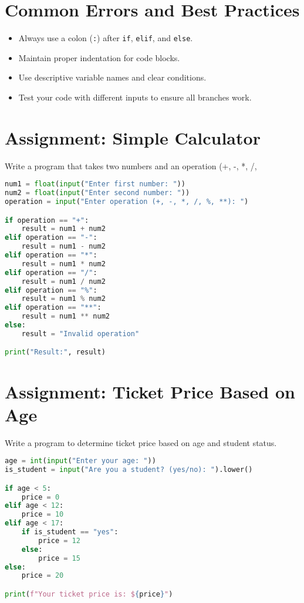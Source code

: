 \section{Common Errors and Best Practices}

\begin{itemize}
    \item Always use a colon (\texttt{:}) after \texttt{if}, \texttt{elif}, and \texttt{else}.
    \item Maintain proper indentation for code blocks.
    \item Use descriptive variable names and clear conditions.
    \item Test your code with different inputs to ensure all branches work.
\end{itemize}

\section{Assignment: Simple Calculator}

Write a program that takes two numbers and an operation (+, -, *, /, %

\begin{lstlisting}[language=Python]
num1 = float(input("Enter first number: "))
num2 = float(input("Enter second number: "))
operation = input("Enter operation (+, -, *, /, %, **): ")

if operation == "+":
    result = num1 + num2
elif operation == "-":
    result = num1 - num2
elif operation == "*":
    result = num1 * num2
elif operation == "/":
    result = num1 / num2
elif operation == "%":
    result = num1 % num2
elif operation == "**":
    result = num1 ** num2
else:
    result = "Invalid operation"

print("Result:", result)
\end{lstlisting}

\section{Assignment: Ticket Price Based on Age}

Write a program to determine ticket price based on age and student status.

\begin{lstlisting}[language=Python]
age = int(input("Enter your age: "))
is_student = input("Are you a student? (yes/no): ").lower()

if age < 5:
    price = 0
elif age < 12:
    price = 10
elif age < 17:
    if is_student == "yes":
        price = 12
    else:
        price = 15
else:
    price = 20

print(f"Your ticket price is: ${price}")
\end{lstlisting}

